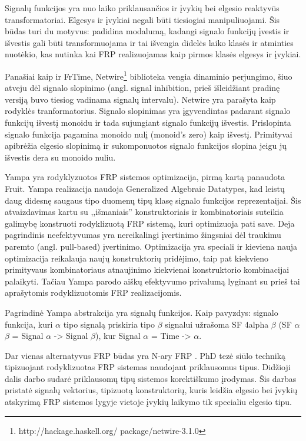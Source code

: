 Signalų funkcijos yra nuo laiko priklausančios ir įvykių bei elgesio reaktyvūs transformatoriai. Elgesys ir įvykiai negali būti tiesiogiai manipuliuojami. Šis būdas turi du motyvus: padidina modalumą, kadangi signalo funkcijų įvestis ir išvestis gali būti transformuojama ir tai išvengia didelės laiko klasės ir atminties nuotėkio, kas nutinka kai FRP realizuojamas kaip pirmos klasės elgesys ir įvykiai.

Panašiai kaip ir FrTime, Netwire\footnote{http://hackage.haskell.org/ package/netwire-3.1.0} biblioteka vengia dinaminio perjungimo, šiuo atveju dėl signalo slopinimo (angl. signal inhibition, prieš išleidžiant pradinę versiją buvo tiesiog vadinama signalų intervalu). Netwire yra parašyta kaip rodyklės tranformatorius. Signalo slopinimas yra įgyvendintas padarant signalo funkcijų išvestį monoidu ir tada sujungiant signalo funkcijų išvestis. Prislopinta signalo funkcija pagamina monoido nulį (monoid's zero) kaip išvestį. Primityvai apibrėžia elgesio slopinimą ir sukomponuotos signalo funkcijos slopina jeigu jų išvestis dera su monoido nuliu.

Yampa \cite{Nilsson:2005:DOF:1090189.1086374} yra rodyklyzuotos FRP sistemos optimizacija, pirmą kartą panaudota Fruit. Yampa realizacija naudoja Generalized Algebraic Datatypes, kad leistų daug didesnę saugaus tipo duomenų tipų klasę signalo funkcijos reprezentaijai. Šis atvaizdavimas kartu su ,,išmaniais'' konstruktoriais ir kombinatoriais suteikia galimybę konstruoti rodyklizuotą FRP sistemą, kuri optimizuoja pati save. Deja pagrindinis neefektyvumas yra nereikalingi įvertinimo žingsniai dėl traukimu paremto (angl. pull-based) įvertinimo. Optimizacija yra speciali ir kieviena nauja optimizacija reikalauja naujų konstruktorių pridėjimo, taip pat kiekvieno primityvaus kombinatoriaus atnaujinimo kiekvienai konstruktorio kombinacijai palaikyti. Tačiau Yampa parodo aiškų efektyvumo privalumą lyginant su prieš tai aprašytomis rodyklizuotomis FRP realizacijomis.

Pagrindinė Yampa abstrakcija yra signalų funkcijos. Kaip pavyzdys: signalo funkcija, kuri $\alpha$ tipo signalą priskiria tipo $\beta$ signalui užrašoma SF 4alpha $\beta$ (SF $\alpha$ $\beta$ = Signal $\alpha$ -> Signal $\beta$), kur Signal $\alpha$  = Time -> $\alpha$.

Dar vienas alternatyvus FRP būdas yra N-ary FRP \cite{Sculthorpe11towardssafe}. PhD tezė  siūlo techniką tipizuojant rodyklizuotas FRP sistemas naudojant priklausomus tipus. Didžioji dalis darbo sudarė priklausomų tipų sistemos korektiškumo įrodymas. Šis darbas pristatė signalų vektorius, tipizuotą konstruktorių, kuris leidžia elgesio bei įvykių atskyrimą FRP sistemos lygyje vietoje įvykių laikymo tik specialiu elgesio tipu.

